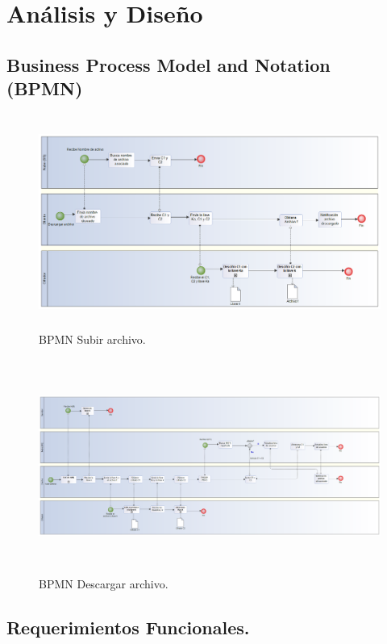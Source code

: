 \chapter{An\'alisis y Dise\~no} %

\section{Business Process Model and Notation (BPMN)}


\begin{figure}[H]
\centering
	\includegraphics[width=16cm, height=7cm]{./images/bp_descargar.png}
	\caption{BPMN Subir archivo.}

\end{figure}

\begin{figure}[H]
\centering
	\includegraphics[width=16cm, height=7cm]{./images/bp_subir.png}
	\caption{BPMN Descargar archivo.}

\end{figure}

\section{Requerimientos Funcionales. }

